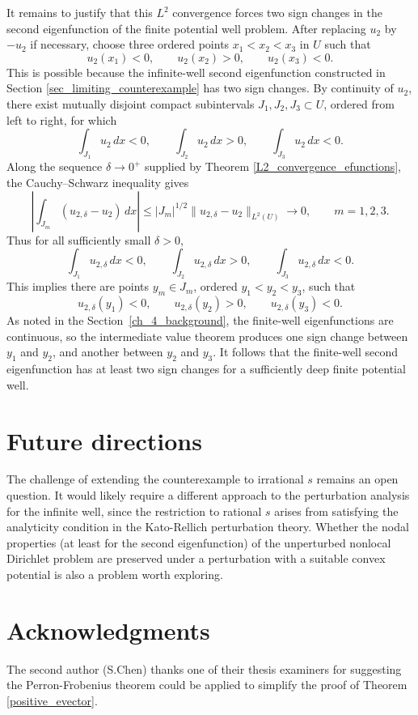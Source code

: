 \documentclass[preprint,12pt]{elsarticle}
\begin{document}
{It remains to justify that this $L^2$ convergence forces two sign changes in the second eigenfunction of the finite potential well problem. After replacing $u_2$ by $-u_2$ if
necessary, choose three ordered points $x_1<x_2<x_3$ in $U$ such that
\[
    u_2(x_1)<0,\qquad u_2(x_2)>0,\qquad u_2(x_3)<0.
\]
This is possible because the infinite-well second eigenfunction constructed
in Section \ref{sec_limiting_counterexample} has two sign changes. By
continuity of $u_2$, there exist mutually disjoint compact subintervals
$J_1,J_2,J_3\subset U$, ordered from left to right, for which
\[
    \int_{J_1}u_2\,dx<0,\qquad
    \int_{J_2}u_2\,dx>0,\qquad
    \int_{J_3}u_2\,dx<0.
\]
Along the sequence $\delta\to0^+$ supplied by Theorem
\ref{L2_convergence_efunctions}, the Cauchy--Schwarz inequality gives
\[
\left|\int_{J_m}(u_{2,\delta}-u_2)\,dx\right|
\leq |J_m|^{1/2}
\|u_{2,\delta}-u_2\|_{L^2(U)}
\longrightarrow0,
\qquad m=1,2,3.
\]
Thus for all sufficiently small $\delta>0$,
\[
    \int_{J_1}u_{2,\delta}\,dx<0,\qquad
    \int_{J_2}u_{2,\delta}\,dx>0,\qquad
    \int_{J_3}u_{2,\delta}\,dx<0.
\]
This implies there are points $y_m\in J_m$, ordered $y_1<y_2<y_3$, such that
\[
    u_{2,\delta}(y_1)<0,\qquad
    u_{2,\delta}(y_2)>0,\qquad
    u_{2,\delta}(y_3)<0.
\]
As noted in the Section~\ref{ch_4_background}, the finite-well eigenfunctions are continuous, so the intermediate value theorem produces one sign change between $y_1$ and $y_2$, and another between $y_2$ and $y_3$. It follows that the finite-well second eigenfunction has at least two sign changes for a sufficiently deep finite potential well.

%
\section{Future directions} 
The challenge of extending the counterexample to irrational $s$ remains an open question. It would likely require a different approach to the perturbation analysis for the infinite well, since the restriction to rational $s$ arises from satisfying the analyticity condition in the Kato-Rellich perturbation theory. Whether the nodal properties (at least for the second eigenfunction) of the unperturbed nonlocal Dirichlet problem are preserved under a perturbation with a suitable convex potential is also a problem worth exploring.

\section*{Acknowledgments}
The second author (S.Chen) thanks one of their thesis examiners for suggesting the Perron-Frobenius theorem could be applied to simplify the proof of Theorem \ref{positive_evector}.

}
\end{document}
